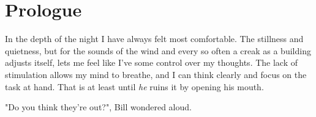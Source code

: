 \chapter*{Prologue} 


In the depth of the night I have always felt most comfortable. The stillness and
quietness, but for the sounds of the wind and every so often a creak as a
building adjusts itself, lets me feel like I've some control over my thoughts.
The lack of stimulation allows my mind to breathe, and I can think clearly and
focus on the task at hand. That is at least until \textit{he} ruins it by
opening his mouth. 

"Do you think they're out?", Bill wondered aloud. 
